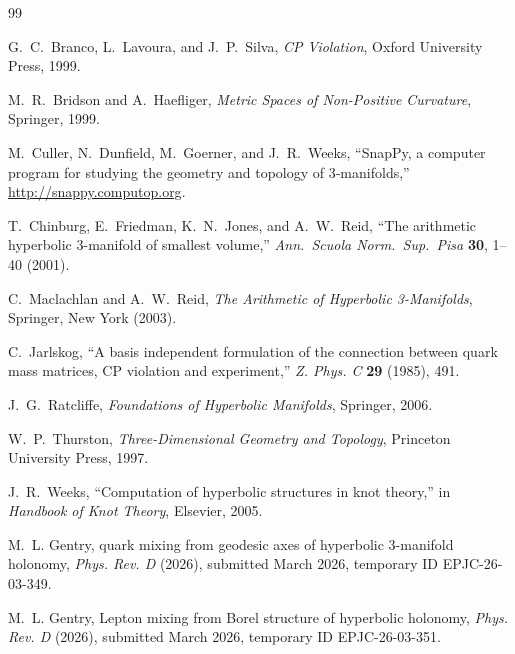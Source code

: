 \documentclass[epjc3]{svjour3}
\begin{document}
\begin{thebibliography}{99}

G.~C.~Branco, L.~Lavoura, and J.~P.~Silva,
\emph{CP Violation},
Oxford University Press, 1999.

M.~R.~Bridson and A.~Haefliger,
\emph{Metric Spaces of Non-Positive Curvature},
Springer, 1999.

M.~Culler, N.~Dunfield, M.~Goerner, and J.~R.~Weeks,
``SnapPy, a computer program for studying the geometry and topology
of 3‑manifolds,'' \url{http://snappy.computop.org}.

T.~Chinburg, E.~Friedman, K.~N.~Jones, and A.~W.~Reid,
``The arithmetic hyperbolic 3-manifold of smallest volume,''
\emph{Ann.\ Scuola Norm.\ Sup.\ Pisa} \textbf{30}, 1--40 (2001).

C.~Maclachlan and A.~W.~Reid,
\emph{The Arithmetic of Hyperbolic 3-Manifolds},
Springer, New York (2003).

C.~Jarlskog,
``A basis independent formulation of the connection between quark mass
matrices, CP violation and experiment,''
\emph{Z. Phys. C} \textbf{29} (1985), 491.

J.~G.~Ratcliffe,
\emph{Foundations of Hyperbolic Manifolds},
Springer, 2006.

W.~P.~Thurston,
\emph{Three-Dimensional Geometry and Topology},
Princeton University Press, 1997.

J.~R.~Weeks,
``Computation of hyperbolic structures in knot theory,''
in \emph{Handbook of Knot Theory}, Elsevier, 2005.


M.~L. Gentry,
 quark mixing from geodesic axes of hyperbolic 3-manifold holonomy,
\newblock \emph{Phys. Rev. D} (2026), submitted March 2026, temporary {ID} EPJC-26-03-349.

M.~L. Gentry,
\newblock Lepton mixing from Borel structure of hyperbolic holonomy,
\newblock \emph{Phys. Rev. D} (2026), submitted March 2026, temporary {ID} EPJC-26-03-351.
\end{thebibliography}
\end{document}
